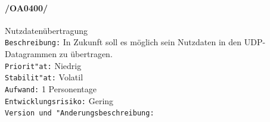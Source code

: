 \paragraph{/OA0400/} Nutzdatenübertragung\\
\texttt{Beschreibung:} In Zukunft soll es möglich sein Nutzdaten in den
UDP-Datagrammen zu übertragen.\\
\texttt{Priorit"at:} Niedrig\\
\texttt{Stabilit"at:} Volatil\\
\texttt{Aufwand:} 1 Personentage\\
\texttt{Entwicklungsrisiko:} Gering\\
\texttt{Version und "Anderungsbeschreibung:}